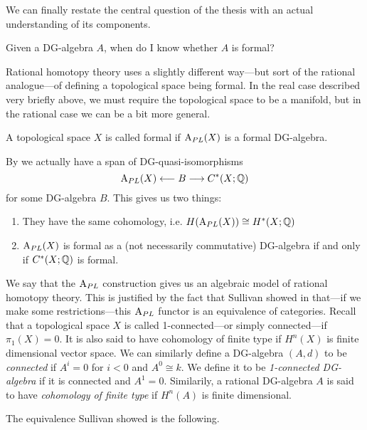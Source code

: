 We can finally restate the central question of the thesis with an actual understanding of its components.
\begin{central}
Given a DG-algebra $A$, when do I know whether $A$ is formal? 
\end{central}

Rational homotopy theory uses a slightly different way---but sort of the rational analogue---of defining a topological space being formal. In the real case described very briefly above, we must require the topological space to be a manifold, but in the rational case we can be a bit more general. 


\begin{definition}
A topological space $X$ is called formal if $\text{A}_{PL}(X)$ is a formal DG-algebra. 
\end{definition}

By \cite[Corollary 10.10]{FHT} we actually have a span of DG-quasi-isomorphisms 
\begin{equation*}
    \text{A}_{PL}(X)\longleftarrow B \longrightarrow C^*(X;\mathbb{Q})
\end{equation*}
for some DG-algebra $B$. This gives us two things:
\begin{enumerate}
    \item They have the same cohomology, i.e. $H(\text{A}_{PL}(X)) \cong H^*(X;\mathbb{Q})$
    \item $\text{A}_{PL}(X)$ is formal as a (not necessarily commutative) DG-algebra if and only if $C^*(X;\mathbb{Q})$ is formal. 
\end{enumerate}

We say that the $\text{A}_{PL}$ construction gives us an algebraic model of rational homotopy theory. This is justified by the fact that Sullivan showed in \cite{Sullivan} that---if we make some restrictions---this $\text{A}_{PL}$ functor is an equivalence of categories. Recall that a topological space $X$ is called 1-connected---or simply connected---if $\pi_1(X)=0$. It is also said to have cohomology of finite type if $H^n(X)$ is finite dimensional vector space. We can similarly define a DG-algebra $(A, d)$ to be \emph{connected} if $A^i = 0$ for $i< 0$ and $A^0\cong k$. We define it to be \emph{1-connected DG-algebra} if it is connected and $A^1=0$. Similarily, a rational DG-algebra $A$ is said to have \emph{cohomology of finite type} if $H^n(A)$ is finite dimensional. 

The equivalence Sullivan showed is the following.

